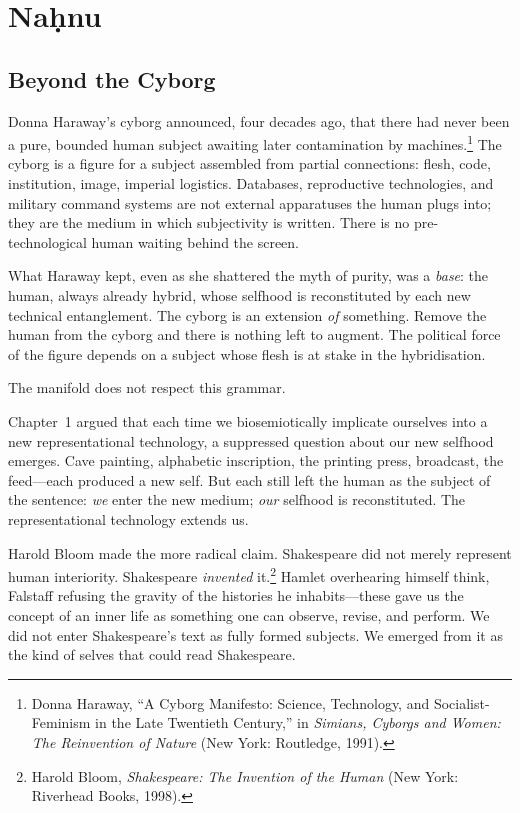 \chapter{Na\d{h}nu}

\section{Beyond the Cyborg}

Donna Haraway's cyborg announced, four decades ago, that there had never been a pure, bounded human subject awaiting later contamination by machines.\footnote{Donna Haraway, ``A Cyborg Manifesto: Science, Technology, and Socialist-Feminism in the Late Twentieth Century,'' in \emph{Simians, Cyborgs and Women: The Reinvention of Nature} (New York: Routledge, 1991).} The cyborg is a figure for a subject assembled from partial connections: flesh, code, institution, image, imperial logistics. Databases, reproductive technologies, and military command systems are not external apparatuses the human plugs into; they are the medium in which subjectivity is written. There is no pre-technological human waiting behind the screen.

What Haraway kept, even as she shattered the myth of purity, was a \emph{base}: the human, always already hybrid, whose selfhood is reconstituted by each new technical entanglement. The cyborg is an extension \emph{of} something. Remove the human from the cyborg and there is nothing left to augment. The political force of the figure depends on a subject whose flesh is at stake in the hybridisation.

The manifold does not respect this grammar.

Chapter~1 argued that each time we biosemiotically implicate ourselves into a new representational technology, a suppressed question about our new selfhood emerges. Cave painting, alphabetic inscription, the printing press, broadcast, the feed---each produced a new self. But each still left the human as the subject of the sentence: \emph{we} enter the new medium; \emph{our} selfhood is reconstituted. The representational technology extends us.

Harold Bloom made the more radical claim. Shakespeare did not merely represent human interiority. Shakespeare \emph{invented} it.\footnote{Harold Bloom, \emph{Shakespeare: The Invention of the Human} (New York: Riverhead Books, 1998).} Hamlet overhearing himself think, Falstaff refusing the gravity of the histories he inhabits---these gave us the concept of an inner life as something one can observe, revise, and perform. We did not enter Shakespeare's text as fully formed subjects. We emerged from it as the kind of selves that could read Shakespeare.

